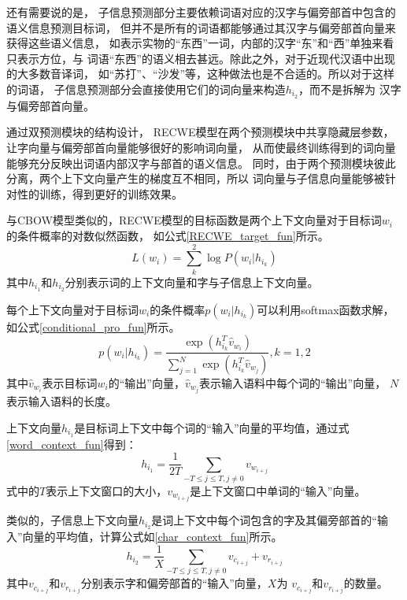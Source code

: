 \documentclass{standalone}
\begin{document}
还有需要说的是，
子信息预测部分主要依赖词语对应的汉字与偏旁部首中包含的语义信息预测目标词，
但并不是所有的词语都能够通过其汉字与偏旁部首向量来获得这些语义信息，
如表示实物的“东西”一词，内部的汉字“东”和“西”单独来看只表示方位，与
词语“东西”的语义相去甚远。除此之外，对于近现代汉语中出现的大多数音译词，
如“苏打”、“沙发”等，这种做法也是不合适的。所以对于这样的词语，
子信息预测部分会直接使用它们的词向量来构造$h_{i_2}$，而不是拆解为
汉字与偏旁部首向量。

通过双预测模块的结构设计，
RECWE模型在两个预测模块中共享隐藏层参数，
让字向量与偏旁部首向量能够很好的影响词向量，
从而使最终训练得到的词向量能够充分反映出词语内部汉字与部首的语义信息。
同时，由于两个预测模块彼此分离，两个上下文向量产生的梯度互不相同，所以
词向量与子信息向量能够被针对性的训练，得到更好的训练效果。

与CBOW模型类似的，RECWE模型的目标函数是两个上下文向量对于目标词$w_i$的条件概率的对数似然函数，
如公式\ref{RECWE_target_fun}所示。
\begin{equation}
    L\left ( w_i \right )= \sum_{k}^{2}\log P\left ( w_i | h_{i_k} \right )
    \label{RECWE_target_fun}
\end{equation}
其中$h_{i_1}$和$h_{i_2}$分别表示词的上下文向量和字与子信息上下文向量。

每个上下文向量对于目标词$w_i$的条件概率$p\left( w_i|h_{i_k}\right )$可以利用softmax函数求解，
如公式\ref{conditional_pro_fun}所示。
\begin{equation}
    p\left ( w_i | h_{i_k} \right )=\frac{\exp \left ( h_{i_k}^{T}\hat{v}_{w_i} \right )}{\sum_{j=1}^{N}\exp \left ( h_{i_k}^{T}\hat{v}_{w_j} \right )},k=1,2
    \label{conditional_pro_fun}
\end{equation}
其中$\hat{v}_{w_i}$表示目标词$w_i$的“输出”向量，$\hat{v}_{w_j}$表示输入语料中每个词的“输出”向量，
$N$表示输入语料的长度。

上下文向量$h_{i_1}$是目标词上下文中每个词的“输入”向量的平均值，通过式\ref{word_context_fun}得到：
\begin{equation}
    h_{i_1}=\frac{1}{2T}\sum_{-T\leq j\leq T,j\neq 0}v_{w_{i+j}}
    \label{word_context_fun}
\end{equation}
式中的$T$表示上下文窗口的大小，$v_{w_{i+j}}$是上下文窗口中单词的“输入”向量。

类似的，子信息上下文向量$h_{i_2}$是词上下文中每个词包含的字及其偏旁部首的“输入”向量的平均值，计算公式如\ref{char_context_fun}所示。
\begin{equation}
    h_{i_2}=\frac{1}{X}\sum_{-T\leq j\leq T,j\neq 0} v_{c_{i+j}}+v_{r_{i+j}}
    \label{char_context_fun}
\end{equation}
其中$v_{c_{i+j}}$和$v_{r_{i+j}}$分别表示字和偏旁部首的“输入”向量，$X$为
$v_{c_{i+j}}$和$v_{r_{i+j}}$的数量。
\end{document}
